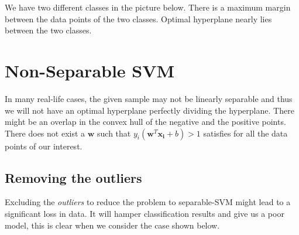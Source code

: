 \documentclass[12pt]{article}
\begin{document}
\vspace{10pt}

  \noindent We have two different classes in the picture below. There is a maximum margin between the data points of the two classes. Optimal hyperplane nearly lies between the two classes.



  
  \newpage





\vspace{-30pt}


\section{Non-Separable SVM}
In many real-life cases, the given sample may not be linearly separable and thus we will not have an optimal hyperplane perfectly dividing the hyperplane. There might be an overlap in the convex hull of the negative and the positive points. There does not exist a  $\boldsymbol{w}$ such that $y_i(\boldsymbol{w}^T\boldsymbol{x_i}+b) > 1$  satisfies for all the data points of our interest.


\vspace{-15pt}



\vspace{-35pt}

\subsection{Removing the outliers}


\noindent Excluding the \textit{outliers} to reduce the problem to separable-SVM might lead to a significant loss in data. It will hamper classification results and give us a poor model, this is clear when we consider the case shown below.




\newpage
\end{document}
